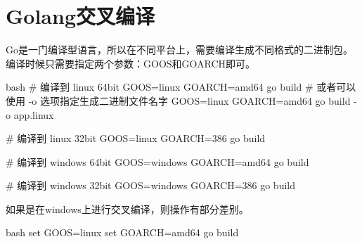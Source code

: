 \section{Golang交叉编译}
Go是一门编译型语言，所以在不同平台上，需要编译生成不同格式的二进制包。
编译时候只需要指定两个参数：GOOS和GOARCH即可。
\begin{code-block}{bash}
# 编译到 linux 64bit
GOOS=linux GOARCH=amd64 go build
# 或者可以使用 -o 选项指定生成二进制文件名字
GOOS=linux GOARCH=amd64 go build -o app.linux

# 编译到 linux 32bit
GOOS=linux GOARCH=386 go build

# 编译到 windows 64bit
GOOS=windows GOARCH=amd64 go build

# 编译到 windows 32bit
GOOS=windows GOARCH=386 go build
\end{code-block}

如果是在windows上进行交叉编译，则操作有部分差别。
\begin{code-block}{bash}
set GOOS=linux
set GOARCH=amd64
go build
\end{code-block}

